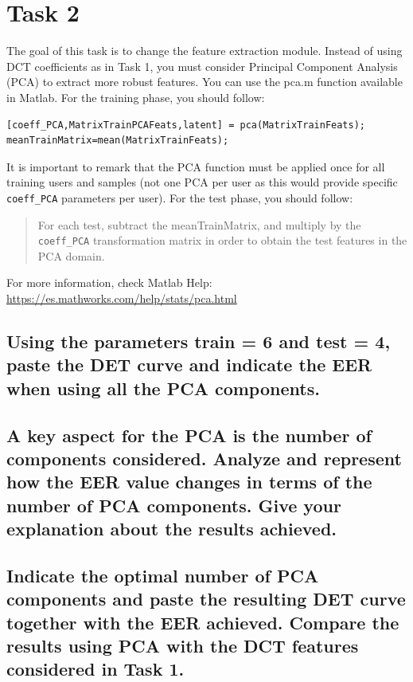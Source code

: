 \documentclass[a4paper]{article}
\def\inline{\lstinline[basicstyle=\ttfamily,keywordstyle={}]}
\begin{document}
\section{Task 2}
The goal of this task is to change the feature extraction module. Instead of using DCT coefficients as in Task 1, you must consider Principal Component Analysis (PCA) to extract more robust features. 
You can use the pca.m function available in Matlab. For the training phase, you should follow:
\begin{verbatim}
[coeff_PCA,MatrixTrainPCAFeats,latent] = pca(MatrixTrainFeats);
meanTrainMatrix=mean(MatrixTrainFeats);
\end{verbatim}
It is important to remark that the PCA function must be applied once for all training users and samples (not one PCA per user as this would provide specific \inline{coeff_PCA} parameters per user).  
For the test phase, you should follow:
\begin{quote}
For each test, subtract the meanTrainMatrix, and multiply by the \inline{coeff_PCA} transformation matrix in order to obtain the test features in the PCA domain.
\end{quote}
For more information, check Matlab Help: \url{https://es.mathworks.com/help/stats/pca.html}

\subsection{ Using the parameters train = 6 and test = 4, paste the DET curve and indicate the EER when using all the PCA components.}






\subsection{ A key aspect for the PCA is the number of components considered. Analyze and represent how the EER value changes in terms of the number of PCA components. Give your explanation about the results achieved.}


\subsection{ Indicate the optimal number of PCA components and paste the resulting DET curve together with the EER achieved. Compare the results using PCA with the DCT features considered in Task 1.}
\end{document}
